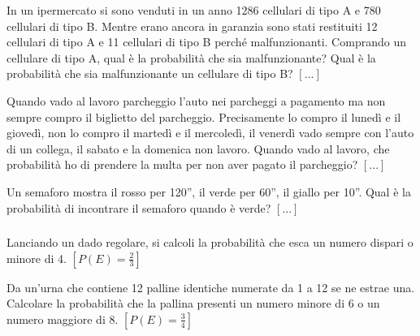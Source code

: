 \begin{esercizio}
 \label{ese:9.25}
In un ipermercato si sono venduti in un anno 1286 cellulari di tipo A e 780 
cellulari di tipo B. Mentre erano ancora in garanzia sono stati restituiti 12 
cellulari di tipo A e 11 cellulari di tipo B perché malfunzionanti. Comprando un 
cellulare di tipo A, qual è la probabilità che sia malfunzionante? Qual è la 
probabilità che sia malfunzionante un cellulare di tipo B?
\hfill $\left[...\right]$
\end{esercizio}

\begin{esercizio}
 \label{ese:9.26}
Quando vado al lavoro parcheggio l'auto nei parcheggi a pagamento ma non sempre 
compro il biglietto del parcheggio. Precisamente lo compro il lunedì e il 
giovedì, non lo compro il martedì e il mercoledì, il venerdì vado sempre con 
l'auto di un collega, il sabato e la domenica non lavoro. Quando vado al lavoro, 
che probabilità ho di prendere la multa per non aver pagato il parcheggio?
\hfill $\left[...\right]$
\end{esercizio}

\begin{esercizio}
 \label{ese:9.27}
Un semaforo mostra il rosso per 120'', il verde per 60'', il giallo per 10''. 
Qual è la probabilità di incontrare il semaforo quando è verde?
\hfill $\left[...\right]$
\end{esercizio}

\subsubsection*{}

\begin{esercizio}[\Ast]
 \label{ese:9.28}
 Lanciando un dado regolare, si calcoli la probabilità che esca un numero 
dispari o minore di 4.
\hfill $\left[P(E)=\frac 2 3\right]$
\end{esercizio}

\begin{esercizio}[\Ast]
 \label{ese:9.29}
Da un'urna che contiene 12 palline identiche numerate da 1 a 12 se ne estrae 
una. Calcolare la probabilità che la pallina presenti un numero minore di 6 o un 
numero maggiore di 8.
\hfill $\left[P(E)=\frac 3 4\right]$
\end{esercizio}

